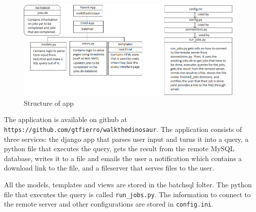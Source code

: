 \begin{figure}
\center
\includegraphics[width=.8\textwidth]{figs/structure}
\caption{Structure of app}
\label{fig:structure}
\end{figure}

The application is available on github at \verb`https://github.com/gtfierro/walkthedinosaur`. The application consists of three services: the django app that parses user input and turns it into a query, a python file that executes the query, gets the result from the remote MySQL database, writes it to a file and emails the user a notification which contains a download link to the file, and a fileserver that serves files to the user. 

All the models, templates and views are stored in the batchsql folter. The python file that executes the query is called \verb`run_jobs.py`. The information to connect to the remote server and other configurations are stored in \verb`config.ini`.